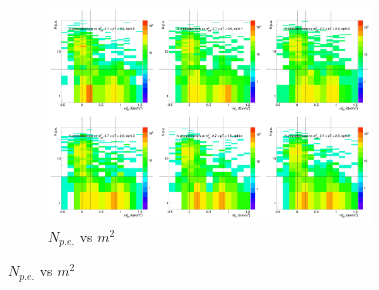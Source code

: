 \begin{figure}[H]
  \centering
    \begin{subfigure}{1\textwidth}
   \centering
   \includegraphics[width=0.94\textwidth]{hiptfits/pos/PSaccthreshold_cent0_ich1_accfire0_ptbin11.jpg}
    \caption{$N_{p.e.}$ vs $m^2$}
    \end{subfigure}
\end{figure}
